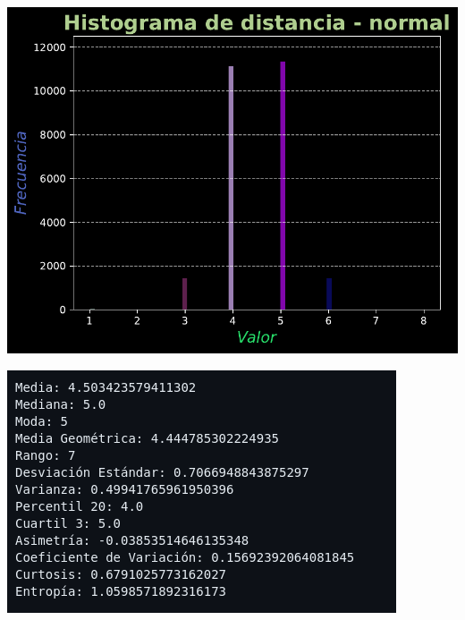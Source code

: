 \documentclass[11pt]{article} %
\begin{document}
	 \begin{multicols}{2}
	 	\begin{minipage}{\linewidth}
	 		\centering
	 		\includegraphics[width=0.9\linewidth]{hist_distancia_normal.pdf}
	 		\label{fig:distNormalHist}
	 	\end{minipage}
	 	\vfill\columnbreak
	 	\begin{minipage}{\linewidth}
	 		\centering
	 		\includegraphics[width=1\linewidth]{n2.png}%
	 		\label{distNormalMet}
	 	\end{minipage}
	 \end{multicols}
	 
\end{document}
